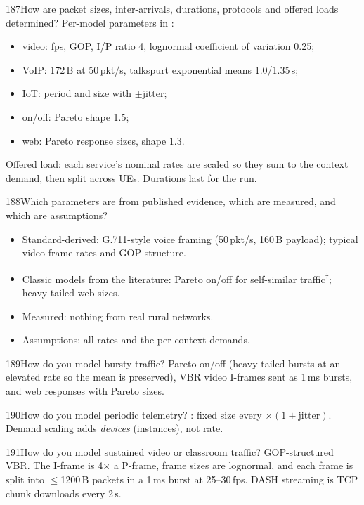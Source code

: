 \begin{qa}{187}{How are packet sizes, inter-arrivals, durations, protocols and offered loads determined?}
Per-model parameters in :
\begin{itemize}
\item video: fps, GOP, I/P ratio 4, lognormal coefficient of variation 0.25;
\item VoIP: 172\,B at 50\,pkt/s, talkspurt exponential means 1.0/1.35\,s;
\item IoT: period and size with $\pm$jitter;
\item on/off: Pareto shape 1.5;
\item web: Pareto response sizes, shape 1.3.
\end{itemize}
Offered load: each service's nominal rates are scaled so they sum to the context demand, then split across UEs.
Durations last for the run.
\end{qa}

\begin{qa}{188}{Which parameters are from published evidence, which are measured, and which are assumptions?}
\begin{itemize}
\item Standard-derived: G.711-style voice framing (50\,pkt/s, 160\,B payload); typical video frame rates and GOP structure.
\item Classic models from the literature: Pareto on/off for self-similar traffic\textsuperscript{†}; heavy-tailed web sizes.
\item Measured: nothing from real rural networks.
\item Assumptions: all rates and the per-context demands.
\end{itemize}
\end{qa}

\begin{qa}{189}{How do you model bursty traffic?}
Pareto on/off (heavy-tailed bursts at an elevated rate so the mean is preserved), VBR video I-frames sent as 1\,ms
bursts, and web responses with Pareto sizes.
\end{qa}

\begin{qa}{190}{How do you model periodic telemetry?}
: fixed size every $\times(1\pm\text{jitter})$. Demand scaling adds
\emph{devices} (instances), not rate.
\end{qa}

\begin{qa}{191}{How do you model sustained video or classroom traffic?}
GOP-structured VBR. The I-frame is 4$\times$ a P-frame, frame sizes are lognormal, and each frame is split into
$\le$1200\,B packets in a 1\,ms burst at 25--30\,fps. DASH streaming is TCP chunk downloads every 2\,s.
\end{qa}

